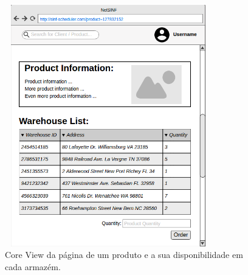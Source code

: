\begin{titlepage}
\begin{figure}[H]
  \centering
    \includegraphics[width=9cm, height = 10.5cm]{SINF_productpage.png}
  \caption{Core View da página de um produto e a sua disponibilidade em cada armazém.}
  \label{uml}
\end{figure}


\end{titlepage}
